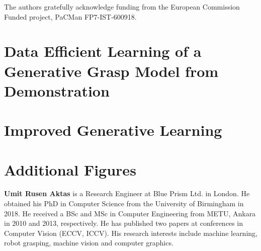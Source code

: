 \documentclass{ws-ijhr}
\begin{document}
The authors gratefully acknowledge funding from the European Commission Funded project, PaCMan FP7-IST-600918.

\appendix

\section{Data Efficient Learning of a Generative Grasp Model from Demonstration}

 \label{section:generative}

\section{Improved Generative Learning}

 \label{section:generative_new}

\section{Additional Figures}

 \label{section:extra_figures}


\vspace*{-5pt}   %


\eject


\noindent%
\parbox{5truein}{
\begin{minipage}[b]{1truein}
\centerline{{}}
\end{minipage}
\hfill         %
\begin{minipage}[b]{3.85truein}
{{\bf Umit Rusen Aktas} is a Research Engineer at Blue Prism Ltd. in London. He obtained his PhD in Computer Science from the University of Birmingham in 2018. He received a BSc and MSc in Computer Engineering from METU, Ankara in 2010 and 2013, respectively. He has published two papers at conferences in Computer Vision (ECCV, ICCV). His research interests include machine learning, robot grasping, machine vision and computer graphics.\hfilneg}
\end{minipage}} %
\end{document}
